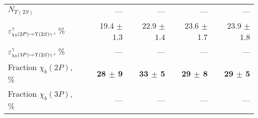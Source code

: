 \begin{table}[H]
{{\begin{tabular}{lrrrr}
\rule{0pt}{4ex}$N_{\Upsilon(2S)}$ & --- & --- & --- & ---\\

\rule{0pt}{4ex}$\varepsilon_{\chi_b(2P) \rightarrow \Upsilon(2S) \gamma}^{\gamma}$, \% & 19.4 $\pm$ 1.3 & 22.9 $\pm$ 1.4 & 23.6 $\pm$ 1.7 & 23.9 $\pm$ 1.8\\
$\varepsilon_{\chi_b(3P) \rightarrow \Upsilon(2S) \gamma}^{\gamma}$, \% & --- & --- & --- & ---\\
\midrule
Fraction $\chi_b(2P)$, \% & \textbf{28 $\pm$ 9} & \textbf{33 $\pm$ 5} & \textbf{29 $\pm$ 8} & \textbf{29 $\pm$ 5}\\
Fraction $\chi_b(3P)$, \% & --- & --- & --- & ---\\
\bottomrule
\end{tabular}
} %

} %
\label{tab:frac:ups2s}
\end{table}


\begin{table}[H]
\caption{\small Summary of \Y3S fraction determination originating from \chib decay}
\centering
{} %
\label{tab:frac:ups3s}
\end{table}
